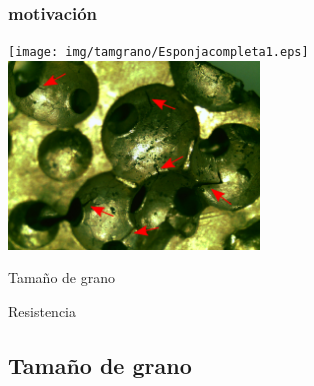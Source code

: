 \documentclass[usenames,dvipsnames]{beamer}
\begin{document}
\begin{frame}
\frametitle{motivación}


\begin{center}

\texttt{[image: img/tamgrano/Esponjacompleta1.eps]}
\includegraphics[width=0.5\textwidth]{img/tamgrano/Fisuras.eps}

\end{center}




Tamaño de grano
 
 Resistencia
\end{frame}


\subsection{Tamaño de grano}



\end{document}
